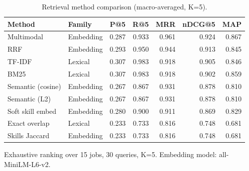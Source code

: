 \begin{table}[htbp]
\centering
\caption{Retrieval method comparison (macro-averaged, K=5).}
\label{tab:method-comparison}
\begin{tabular}{llrrrrr}
\toprule
Method & Family & P@5 & R@5 & MRR & nDCG@5 & MAP \\
\midrule
Multimodal & Embedding & 0.287 & 0.933 & 0.961 & 0.924 & 0.867 \\
RRF & Embedding & 0.293 & 0.950 & 0.944 & 0.913 & 0.845 \\
TF-IDF & Lexical & 0.307 & 0.983 & 0.918 & 0.905 & 0.846 \\
BM25 & Lexical & 0.307 & 0.983 & 0.918 & 0.902 & 0.859 \\
Semantic (cosine) & Embedding & 0.267 & 0.867 & 0.931 & 0.878 & 0.810 \\
Semantic (L2) & Embedding & 0.267 & 0.867 & 0.931 & 0.878 & 0.810 \\
Soft skill embed & Embedding & 0.280 & 0.900 & 0.911 & 0.869 & 0.829 \\
Exact overlap & Lexical & 0.233 & 0.733 & 0.816 & 0.748 & 0.681 \\
Skills Jaccard & Embedding & 0.233 & 0.733 & 0.816 & 0.748 & 0.681 \\
\bottomrule
\end{tabular}
\footnotesize{Exhaustive ranking over 15 jobs, 30 queries, K=5. Embedding model: all-MiniLM-L6-v2.}
\end{table}

